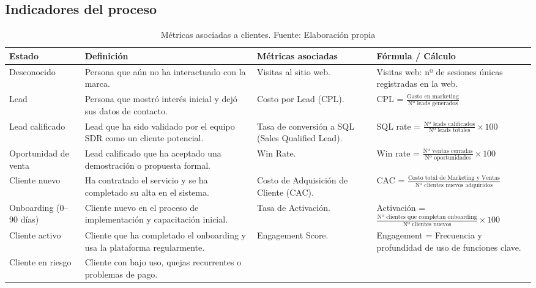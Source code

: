 \begin{appendixd}
  \section{Indicadores del proceso}
\begin{table}[H]
  \begin{threeparttable}
    \centering
    \scriptsize
    \caption{Métricas asociadas a clientes. Fuente: Elaboración propia}
    \renewcommand{\arraystretch}{1.3}
    \begin{tabular}{|l|C{3.5cm}|C{3.3cm}|C{5.5cm}|}
      \hline
      \textbf{Estado} & \textbf{Definición} & \textbf{Métricas asociadas} & \textbf{Fórmula / Cálculo} \\
      \hline
      Desconocido & Persona que aún no ha interactuado con la marca. & Visitas al sitio web. &
      Visitas web: nº de sesiones únicas registradas en la web. \\
      \hline
      Lead & Persona que mostró interés inicial y dejó sus datos de contacto. &
      Costo por Lead (CPL). &
      CPL = $\tfrac{\text{Gasto en marketing}}{\text{Nº leads generados}}$ \\
      \hline
      Lead calificado & Lead que ha sido validado por el equipo SDR como un cliente potencial. &
      Tasa de conversión a SQL (Sales Qualified Lead). &
      SQL rate = $\tfrac{\text{Nº leads calificados}}{\text{Nº leads totales}} \times 100$ \\
      \hline
      Oportunidad de venta & Lead calificado que ha aceptado una demostración o propuesta formal. &
      Win Rate. &
      Win rate = $\tfrac{\text{Nº ventas cerradas}}{\text{Nº oportunidades}} \times 100$ \\
      \hline
      Cliente nuevo & Ha contratado el servicio y se ha completado su alta en el sistema. &
      Costo de Adquisición de Cliente (CAC). &
      CAC = $\tfrac{\text{Costo total de Marketing y Ventas}}{\text{Nº clientes nuevos adquiridos}}$ \\
      \hline
      Onboarding (0--90 días) & Cliente nuevo en el proceso de implementación y capacitación inicial. &
      Tasa de Activación. &
      Activación = $\tfrac{\text{Nº clientes que completan onboarding}}{\text{Nº clientes nuevos}} \times 100$ \\
      \hline
      Cliente activo & Cliente que ha completado el onboarding y usa la plataforma regularmente. &
      Engagement Score. &
      Engagement = Frecuencia y profundidad de uso de funciones clave. \\
      \hline
      Cliente en riesgo & Cliente con bajo uso, quejas recurrentes o problemas de pago. &

\end{tabular}
\end{threeparttable}
\end{table}
\end{appendixd}
